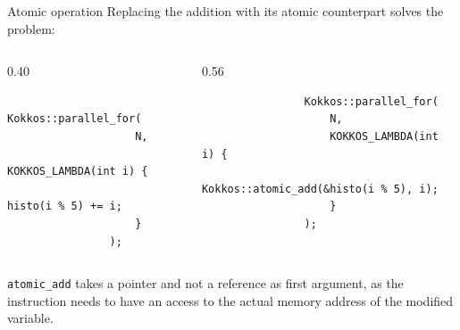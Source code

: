 \documentclass[
    aspectratio=169,
    \createHandout
]{beamer}
\begin{document}
\begin{frame}[fragile]{Atomic operation}
    Replacing the addition with its atomic counterpart solves the problem:
    \begin{columns}
        \begin{column}{0.40\linewidth}
            \begin{verbatim}
                Kokkos::parallel_for(
                    N,
                    KOKKOS_LAMBDA(int i) {
                        histo(i % 5) += i;
                    }
                );
            \end{verbatim}
        \end{column}
        \begin{column}{0.56\linewidth}
            \begin{verbatim}
                Kokkos::parallel_for(
                    N,
                    KOKKOS_LAMBDA(int i) {
                        Kokkos::atomic_add(&histo(i % 5), i);
                    }
                );
            \end{verbatim}
        \end{column}
    \end{columns}
     \texttt{atomic\_add} takes a pointer and not a
    reference as first argument, as the instruction needs to have an access to
    the actual memory address of the modified variable.
\end{frame}
\end{document}
